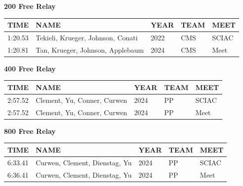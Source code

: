 \begin{table}[H]
\centering
\begin{minipage}[t]{0.6\textwidth}
\centering
\textbf{200 Free Relay}\\[0.1cm]
\begin{tabular}{@{}p{1.8cm}p{2.8cm}p{1.2cm}p{1.4cm}p{1.4cm}@{}}
\hline
    \textbf{TIME} & \textbf{NAME} & \textbf{YEAR} & \textbf{TEAM} & \textbf{MEET} \\
\hline
    1:20.53 & Tekieli, Krueger, Johnson, Conati & 2022 & CMS & SCIAC \\
    1:20.81 & Tan, Krueger, Johnson, Applebaum & 2024 & CMS & Meet \\
\hline
\end{tabular}
\end{minipage}
\end{table}

\begin{table}[H]
\centering
\begin{minipage}[t]{0.6\textwidth}
\centering
\textbf{400 Free Relay}\\[0.1cm]
\begin{tabular}{@{}p{1.8cm}p{2.8cm}p{1.2cm}p{1.4cm}p{1.4cm}@{}}
\hline
    \textbf{TIME} & \textbf{NAME} & \textbf{YEAR} & \textbf{TEAM} & \textbf{MEET} \\
\hline
    2:57.52 & Clement, Yu, Conner, Curwen & 2024 & PP & SCIAC \\
    2:57.52 & Clement, Yu, Conner, Curwen & 2024 & PP & Meet \\
\hline
\end{tabular}
\end{minipage}
\end{table}

\begin{table}[H]
\centering
\begin{minipage}[t]{0.6\textwidth}
\centering
\textbf{800 Free Relay}\\[0.1cm]
\begin{tabular}{@{}p{1.8cm}p{2.8cm}p{1.2cm}p{1.4cm}p{1.4cm}@{}}
\hline
    \textbf{TIME} & \textbf{NAME} & \textbf{YEAR} & \textbf{TEAM} & \textbf{MEET} \\
\hline
    6:33.41 & Curwen, Clement, Dienstag, Yu & 2024 & PP & SCIAC \\
    6:36.41 & Curwen, Clement, Dienstag, Yu & 2024 & PP & Meet \\
\hline
\end{tabular}
\end{minipage}
\end{table}

